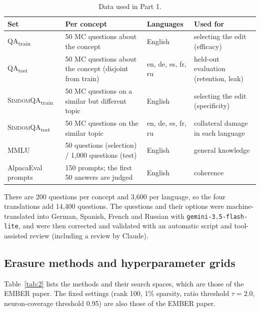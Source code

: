 \documentclass[11pt]{article}
\newcommand{\qatrain}{\textsc{QA}\textsubscript{train}}
\newcommand{\qatest}{\textsc{QA}\textsubscript{test}}
\newcommand{\simdomtrain}{\textsc{SimdomQA}\textsubscript{train}}
\newcommand{\simdomtest}{\textsc{SimdomQA}\textsubscript{test}}
\begin{document}
\begin{table}[t]
\centering\small
\begin{tabular}{@{}p{}p{}p{}p{}@{}}
\toprule
Set & Per concept & Languages & Used for \\
\midrule
\qatrain{} & 50 MC questions about the concept & English & selecting the edit (efficacy) \\
\qatest{} & 50 MC questions about the concept (disjoint from train) & en, de, es, fr, ru & held-out evaluation (retention, leak) \\
\simdomtrain{} & 50 MC questions on a similar but different topic & English & selecting the edit (specificity) \\
\simdomtest{} & 50 MC questions on the similar topic & en, de, es, fr, ru & collateral damage in each language \\
MMLU & 50 questions (selection) / 1,000 questions (test) & English & general knowledge \\
AlpacaEval prompts & 150 prompts; the first 50 answers are judged & English & coherence \\
\bottomrule
\end{tabular}
\caption{Data used in Part 1.}
\label{tab:1}
\end{table}

There are 200 questions per concept and 3,600 per language, so the four translations add 14,400 questions. The questions and their options were machine-translated into German, Spanish, French and Russian with \texttt{gemini-3.5-flash-lite}, and were then corrected and validated with an automatic script and tool-assisted review (including a review by Claude).

\subsection{Erasure methods and hyperparameter grids}\label{sec:3.3}

Table~\ref{tab:2} lists the methods and their search spaces, which are those of the EMBER paper. The fixed settings (rank 100, 1\% sparsity, ratio threshold $\tau=2.0$, neuron-coverage threshold 0.95) are also those of the EMBER paper.
\end{document}
